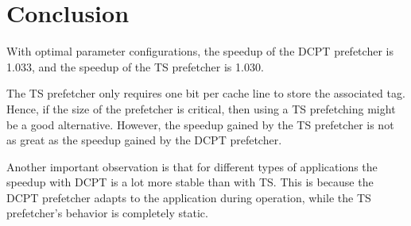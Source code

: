 \section{Conclusion}

With optimal parameter configurations, the speedup of the DCPT prefetcher is
1.033, and the speedup of the TS prefetcher is 1.030.

The TS prefetcher only requires one bit per cache line to store the associated
tag. Hence, if the size of the prefetcher is critical, then using a TS
prefetching might be a good alternative. However, the speedup gained by the TS
prefetcher is not as great as the speedup gained by the DCPT prefetcher.

Another important observation is that for different types of applications the
speedup with DCPT is a lot more stable than with TS. This is because the DCPT
prefetcher adapts to the application during operation, while the TS prefetcher's
behavior is completely static.
